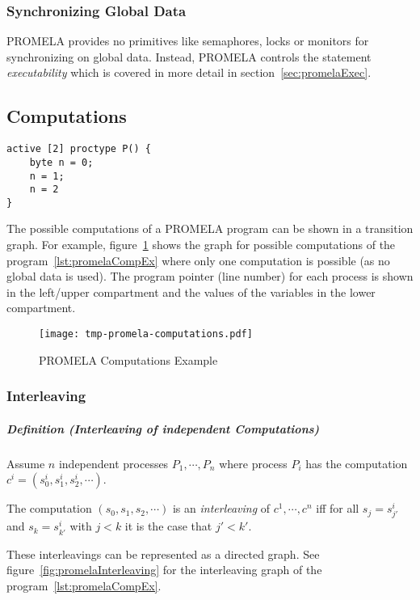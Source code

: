 \documentclass[a4paper, 11pt, accentcolor = tud3b]{tudreport}
\newcommand{\definition}[2]{\subparagraph{Definition (#1)} \begin{adjustwidth}{2cm}{} #2 \end{adjustwidth}}
\begin{document}
				\subsubsection{Synchronizing Global Data}
					PROMELA provides no primitives like semaphores, locks or monitors for synchronizing on global data. Instead, PROMELA controls the statement \textit{executability} which is covered in more detail in section~\ref{sec:promelaExec}.

			\subsection{Computations}
				\label{sec:promelaComp}
			
				\begin{lstlisting}[caption = { PROMELA Computations Example }, label = lst:promelaCompEx, language = PROMELA]
active [2] proctype P() {
	byte n = 0;
	n = 1;
	n = 2
}
				\end{lstlisting}
			
				The possible computations of a PROMELA program can be shown in a transition graph. For example, figure~\ref{fig:promelaComp} shows the graph for possible computations of the program~\ref{lst:promelaCompEx} where only one computation is possible (as no global data is used). The program pointer (line number) for each process is shown in the left/upper compartment and the values of the variables in the lower compartment.
				
				\begin{figure}[H]
					\centering
					\texttt{[image: tmp-promela-computations.pdf]}
					\caption{PROMELA Computations Example}
					\label{fig:promelaComp}
				\end{figure}

				\subsubsection{Interleaving}
					\definition{Interleaving of independent Computations}{
						Assume \(n\) independent processes \( P_1, \cdots, P_n \) where process \( P_i\) has the computation \( c^i = (s_0^i, s_1^i, s_2^i, \cdots) \).
						
						The computation \( (s_0, s_1, s_2, \cdots) \) is an \textit{interleaving} of \( c^1, \cdots, c^n \) iff for all \( s_j = s_{j'}^i \) and \( s_k = s_{k'}^i \) with \( j < k \) it is the case that \( j' < k' \).
					}
				
					These interleavings can be represented as a directed graph. See figure~\ref{fig:promelaInterleaving} for the interleaving graph of the program~\ref{lst:promelaCompEx}.
					
\end{document}
